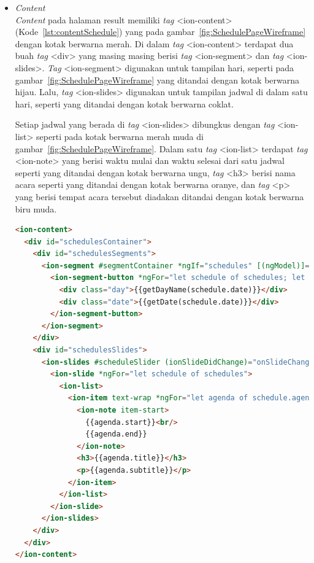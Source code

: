 \begin{itemize}
\begin{itemize}
\begin{lstlisting}[language=html, label={lst:headerSchedule}, caption=\textit{Header} pada schedule.html]
<ion-header>
  <ion-navbar>
    <button ion-button menuToggle>
      <ion-icon name="menu"></ion-icon>
    </button>
    <ion-title>Schedule</ion-title>
  </ion-navbar>
</ion-header>
\end{lstlisting} 

		\item \textit{Content} \\
		\textit{Content} pada halaman result memiliki \textit{tag} <ion-content> (Kode~\ref{lst:contentSchedule}) yang pada gambar~\ref{fig:SchedulePageWireframe} dengan kotak berwarna merah. Di dalam \textit{tag} <ion-content> terdapat dua buah \textit{tag} <div> yang masing masing berisi \textit{tag} <ion-segment> dan \textit{tag} <ion-slides>. \textit{Tag} <ion-segment> digunakan untuk tampilan hari, seperti pada gambar~\ref{fig:SchedulePageWireframe} yang ditandai dengan kotak berwarna hijau. Lalu, \textit{tag} <ion-slides> digunakan untuk tampilan jadwal di dalam satu hari, seperti yang ditandai dengan kotak berwarna coklat. 
		
		Setiap jadwal yang berada di \textit{tag} <ion-slides> dibungkus dengan \textit{tag} <ion-list> seperti pada kotak berwarna merah muda di gambar~\ref{fig:SchedulePageWireframe}. Dalam satu \textit{tag} <ion-list> terdapat \textit{tag} <ion-note> yang berisi waktu mulai dan waktu selesai dari satu jadwal seperti yang ditandai dengan kotak berwarna ungu, \textit{tag} <h3> berisi nama acara seperti yang ditandai dengan kotak berwarna oranye, dan \textit{tag} <p> yang berisi tempat acara tersebut diadakan ditandai dengan kotak berwarna biru muda.
		
		\newpage
		
\begin{lstlisting}[language=html, label={lst:contentSchedule}, caption=\textit{Content} pada schedule.html]
<ion-content>
  <div id="schedulesContainer">
    <div id="schedulesSegments">
      <ion-segment #segmentContainer *ngIf="schedules" [(ngModel)]="selectedSegmentIdx" (ionChange)="onSegmentChanged($event)">
        <ion-segment-button *ngFor="let schedule of schedules; let i = index" [value]="i">
          <div class="day">{{getDayName(schedule.date)}}</div>
          <div class="date">{{getDate(schedule.date)}}</div>
        </ion-segment-button>
      </ion-segment>
    </div>
    <div id="schedulesSlides">
      <ion-slides #scheduleSlider (ionSlideDidChange)="onSlideChanged()">
        <ion-slide *ngFor="let schedule of schedules">
          <ion-list>
            <ion-item text-wrap *ngFor="let agenda of schedule.agenda">
              <ion-note item-start>
                {{agenda.start}}<br/>
                {{agenda.end}}
              </ion-note>
              <h3>{{agenda.title}}</h3>
              <p>{{agenda.subtitle}}</p>
            </ion-item>
          </ion-list>
        </ion-slide>
      </ion-slides>
    </div>
  </div>
</ion-content>
\end{lstlisting} 
		

\end{itemize}
\end{itemize}
